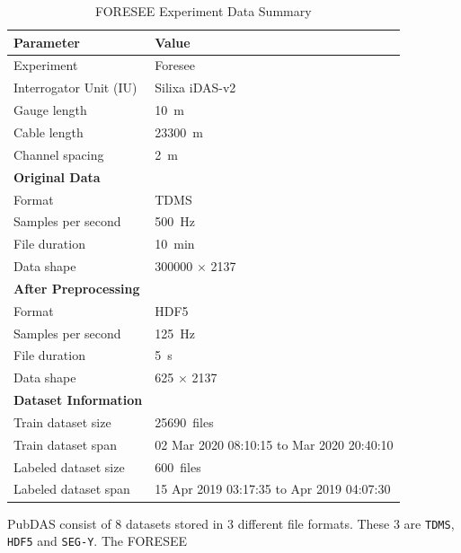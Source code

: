 \begin{table}[!h]
    \centering
    \small
    \begin{tabular}{@{}p{}p{}@{}}
        \toprule
        \textbf{Parameter} & \textbf{Value} \\
        \midrule
        Experiment & Foresee  \\
        Interrogator Unit (IU) & Silixa iDAS-v2  \\
        Gauge length & \qty{10}{\si{\meter}} \\
        Cable length & \qty{23300}{\si{\meter}} \\
        Channel spacing & \qty{2}{\si{\meter}} \\
        \midrule
        \textbf{Original Data} &  \\
        Format & TDMS  \\
        Samples per second & \qty{500}{\si{\hertz}} \\
        File duration & \qty{10}{\si{\minute}} \\
        Data shape & 300000 \(\times\) 2137  \\
        \midrule
        \textbf{After Preprocessing} & \\
        Format & HDF5 \\
        Samples per second & \qty{125}{\si{\hertz}} \\
        File duration & \qty{5}{\si{\second}} \\
        Data shape & 625 \(\times\) 2137  \\
        \midrule
        \textbf{Dataset Information} &  \\
        Train dataset size & \qty{25690}{files} \\
        Train dataset span & 02 Mar 2020 08:10:15 to \newline 03 Mar 2020 20:40:10 \\
        Labeled dataset size & \qty{600}{files} \\
        Labeled dataset span & 15 Apr 2019 03:17:35 to \newline 15 Apr 2019 04:07:30 \\
        \bottomrule
    \end{tabular}
    \caption{FORESEE Experiment Data Summary}
    \label{tab:foresee_experiment_data}
\end{table}

PubDAS consist of 8 datasets stored in 3 different file formats. These 3 are \texttt{TDMS}, \texttt{HDF5} and \texttt{SEG-Y}. 
The FORESEE

